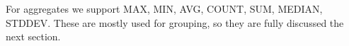 For aggregates we support MAX, MIN, AVG, COUNT, SUM, MEDIAN, STDDEV. These are mostly used for grouping, so they are fully discussed the next section.